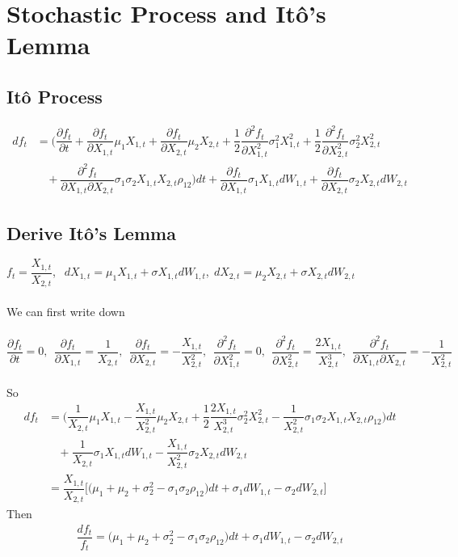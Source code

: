 \documentclass[12pt]{article}
\newcommand{\pfpt}{\dfrac{\partial f_t}{\partial t}}
\begin{document}
\section{Stochastic Process and It\^{o}'s Lemma}
\subsection*{It\^{o} Process}
\begin{align*}
    df_t &= \Big(\pfpt + \dfrac{\partial f_t}{\partial X_{1,t}}\mu_1 X_{1,t} + \dfrac{\partial f_t}{\partial X_{2,t}}\mu_2 X_{2,t} + \dfrac{1}{2} \dfrac{\partial^2 f_t}{\partial X^2_{1,t}}\sigma^2_1 X^2_{1,t} + \dfrac{1}{2} \dfrac{\partial^2 f_t}{\partial X^2_{2,t}}\sigma^2_2 X^2_{2,t}\\
    &\ \ \ \ + \dfrac{\partial^2 f_t}{\partial X_{1,t}\partial X_{2,t}} \sigma_1\sigma_2 X_{1,t}X_{2,t}\rho_{12}\Big)dt + \dfrac{\partial f_t}{\partial X_{1,t}}\sigma_1 X_{1,t}dW_{1,t} + \dfrac{\partial f_t}{\partial X_{2,t}}\sigma_2 X_{2,t}dW_{2,t}
\end{align*}
\subsection*{Derive It\^{o}'s Lemma}
$f_t = \dfrac{X_{1,t}}{X_{2,t}}$, $\ \ $$dX_{1,t} = \mu_1 X_{1,t} + \sigma X_{1,t}dW_{1,t}$,$\ \ $$dX_{2,t} = \mu_2 X_{2,t} + \sigma X_{2,t}dW_{2,t}$\\\\
We can first write down\\\\
$\pfpt = 0,\ \ \dfrac{\partial f_t}{\partial X_{1,t}} = \dfrac{1}{X_{2,t}},\ \ \dfrac{\partial f_t}{\partial X_{2,t}} = -\dfrac{X_{1,t}}{X^2_{2,t}},\ \ \dfrac{\partial^2 f_t}{\partial X^2_{1,t}} = 0,\ \ \dfrac{\partial^2 f_t}{\partial X^2_{2,t}} = \dfrac{2X_{1,t}}{X^3_{2,t}},\ \ \dfrac{\partial^2 f_t}{\partial X_{1,t}\partial X_{2,t}} = -\dfrac{1}{X^2_{2,t}}$\\\\
So
\begin{align*}
    df_t &= \Big(\dfrac{1}{X_{2,t}}\mu_1 X_{1,t} -\dfrac{X_{1,t}}{X^2_{2,t}}\mu_2 X_{2,t} + \dfrac{1}{2}\dfrac{2X_{1,t}}{X^3_{2,t}}\sigma_2^2X^2_{2,t} -\dfrac{1}{X^2_{2,t}}\sigma_1\sigma_2 X_{1,t}X_{2,t}\rho_{12}\Big)dt\\
    &\ \ \ \ + \dfrac{1}{X_{2,t}}\sigma_1 X_{1,t}dW_{1,t} -\dfrac{X_{1,t}}{X^2_{2,t}}\sigma_2 X_{2,t}dW_{2,t}\\
    & = \dfrac{X_{1,t}}{X_{2,t}}\Big[\Big(\mu_1 + \mu_2 + \sigma^2_2 - \sigma_1 \sigma_2 \rho_{12}\Big)dt + \sigma_1 dW_{1,t} - \sigma_2 dW_{2,t}\Big]
\end{align*}
Then
\begin{align*}
    \dfrac{df_t}{f_t} = \Big(\mu_1 + \mu_2 + \sigma^2_2 - \sigma_1 \sigma_2 \rho_{12}\Big)dt + \sigma_1 dW_{1,t} - \sigma_2 dW_{2,t}
\end{align*}
\newpage
\end{document}
